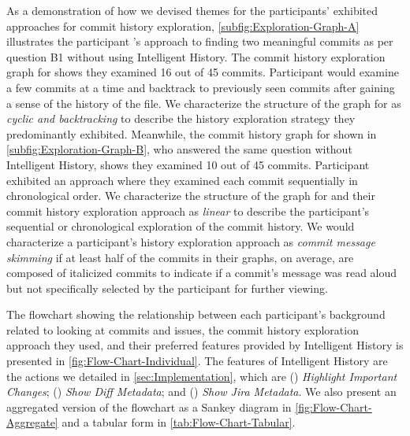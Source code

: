 As a demonstration of how we devised themes for the participants' exhibited approaches for commit history exploration, 
\autoref{subfig:Exploration-Graph-A} illustrates the participant 's approach to finding two meaningful commits as per question B1 without using Intelligent History.
The commit history exploration graph for  shows they examined 16 out of 45 commits.
Participant  would examine a few commits at a time and 
backtrack to previously seen commits after gaining a sense of the history of the file.
We characterize the structure of the graph for  as \textit{cyclic and backtracking}
to describe the history exploration strategy they predominantly exhibited.
Meanwhile, the commit history graph for  shown in \autoref{subfig:Exploration-Graph-B}, who answered the same question without Intelligent History, shows they examined 10 out of 45 commits.
Participant  exhibited an approach where they examined each commit sequentially in chronological order.
We characterize the structure of the graph for  and their commit history exploration approach as \textit{linear} to describe the participant's sequential or chronological exploration of the commit history.
We would characterize a participant's history exploration approach as \textit{commit message skimming} if at least half
of the commits in their graphs, on average, are composed of italicized commits to indicate if a commit's message was read aloud 
but not specifically selected by the participant for further viewing.

The flowchart showing the relationship between each participant's background related to looking at commits and issues,
the commit history exploration approach they used, and their preferred features provided by Intelligent History is presented in \autoref{fig:Flow-Chart-Individual}.
The features of Intelligent History are the actions we detailed in \autoref{sec:Implementation}, which are 
() \textit{Highlight Important Changes}; 
() \textit{Show Diff Metadata}; 
and () \textit{Show Jira Metadata}.
We also present an aggregated version of the flowchart as a Sankey diagram in \autoref{fig:Flow-Chart-Aggregate} 
and a tabular form in \autoref{tab:Flow-Chart-Tabular}.

